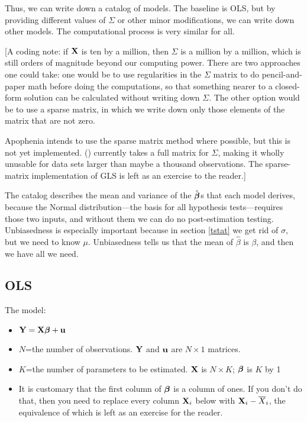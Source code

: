 Thus, we can write down a catalog of models. The baseline is OLS, but by
providing different values of $\Sigma$ or other minor modifications, we
can write down other models. The computational process is very similar
for all.

[A coding note: if ${\bf X}$ is ten by a million, then $\Sigma$ is a million
by a million, which is still orders of magnitude beyond our computing
power. There are two approaches one could take: one would be to use
regularities in the $\Sigma$ matrix to do pencil-and-paper math before
doing the computations, so that something nearer to a closed-form
solution can be calculated without writing down $\Sigma$. The other
option would be to use a sparse matrix, in which
we write down only those elements of the matrix that are not zero. 

Apophenia intends to use the sparse matrix method where possible, but this is not yet
implemented. () currently takes a full matrix
for $\Sigma$, making it wholly unusable for data sets larger than maybe a
thousand observations. The sparse-matrix implementation of GLS is
left as an exercise to the reader.]

The catalog describes the mean and variance of the $\hat{{\mbox{\boldmath$\beta$}}}$s that
each model derives, because the Normal distribution---the basis for all
hypothesis tests---requires those two inputs,
and without them we can do no post-estimation testing. Unbiasedness is especially
important because in section \ref{tstat} we get rid of $\sigma$, but we
need to know $\mu$. Unbiasedness tells us that the mean of $\hat\beta$
is $\beta$, and then we have all we need.

\subsection{OLS}
The model: 
\begin{itemize}
\item ${\bf Y}={\bf X}{\mbox{\boldmath$\beta$}} + {\bf u}$
\item $N$=the number of observations. ${\bf Y}$ and ${\bf u}$ are $N \times 1$
matrices.
\item $K$=the number of parameters to be estimated. ${\bf X}$ is $N \times K$;
${\mbox{\boldmath$\beta$}}$ is $K$ by 1
\item It is customary that the first column of ${\mbox{\boldmath$\beta$}}$ is a column of
ones. If you don't do that, then you need to replace every column ${\bf X}_i$ below
with ${\bf X}_i-\overline X_i$, the equivalence of which is left as an exercise
for the reader.
\end{itemize}

